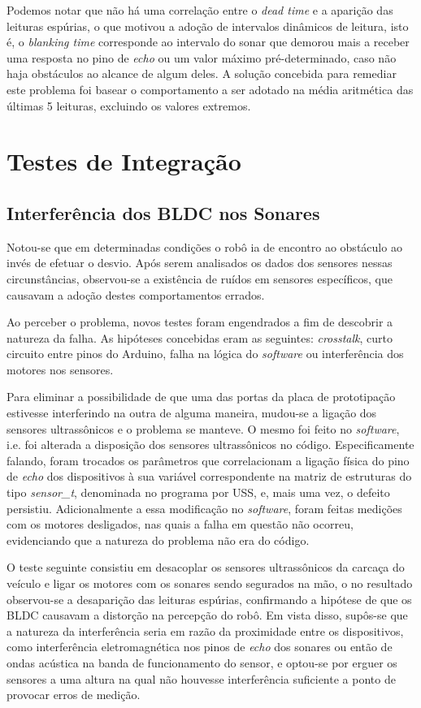 Podemos notar que não há uma correlação entre o \textit{dead time} e a aparição das leituras espúrias, o que motivou a adoção de intervalos dinâmicos 
de leitura, isto é, o \textit{blanking time} corresponde ao intervalo do sonar que demorou mais a receber uma resposta no pino de \textit{echo} ou um 
 valor máximo pré-determinado, caso não haja obstáculos ao alcance de algum deles.
A solução concebida para remediar este problema foi basear o comportamento a ser adotado na média aritmética das últimas 5 leituras, excluindo os 
valores extremos.

\section{Testes de Integração}
\subsection{Interferência dos BLDC nos Sonares}
Notou-se que em determinadas condições o robô ia de encontro ao obstáculo ao invés de efetuar o desvio. 
Após serem analisados os dados dos sensores nessas circunstâncias, observou-se a existência de ruídos em sensores específicos, que causavam a adoção 
destes comportamentos errados.

Ao perceber o problema, novos testes foram engendrados a fim de descobrir a natureza da falha.
As hipóteses concebidas eram as seguintes: \textit{crosstalk}, curto circuito entre pinos do Arduino, falha na lógica do \textit{software} ou 
interferência dos motores nos sensores.

Para eliminar a possibilidade de que uma das portas da placa de prototipação estivesse interferindo na outra de alguma maneira, mudou-se a 
ligação dos sensores ultrassônicos e o problema se manteve.
O mesmo foi feito no \textit{software}, i.e. foi alterada a disposição dos sensores ultrassônicos no código. 
Especificamente falando, foram trocados os parâmetros que correlacionam a ligação física do pino de \textit{echo} dos dispositivos à sua variável 
correspondente na matriz de estruturas do tipo \textit{sensor\_t}, denominada no programa por USS, e, mais uma vez, o defeito persistiu.
Adicionalmente a essa modificação no \textit{software}, foram feitas medições com os motores desligados, nas quais a falha em questão não ocorreu, 
evidenciando que a natureza do problema não era do código.

O teste seguinte consistiu em desacoplar os sensores ultrassônicos da carcaça do veículo e ligar os motores com os sonares sendo segurados na mão, o 
no resultado observou-se a desaparição das leituras espúrias, confirmando a hipótese de que os BLDC causavam a distorção na percepção do robô.
Em vista disso, supôs-se que a natureza da interferência seria em razão da proximidade entre os dispositivos, como interferência eletromagnética nos 
pinos de \textit{echo} dos sonares ou então de ondas acústica na banda de funcionamento do sensor, e optou-se por erguer os sensores a uma altura 
na qual não houvesse interferência suficiente a ponto de provocar erros de medição.

